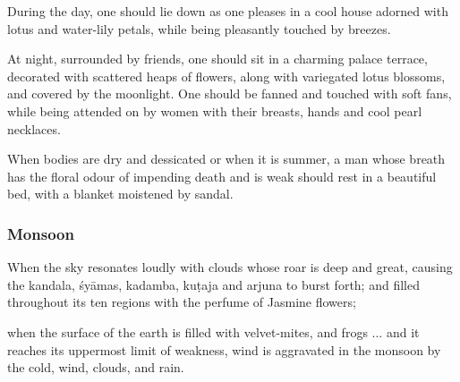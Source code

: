 \begin{translation}
\item[63]
During the day, one should lie down as one pleases %
in a cool house adorned with lotus and water-lily petals, %
while being pleasantly touched by breezes. %

\item[64--66ab]
At night, surrounded by friends, %
one should sit in a charming %
palace terrace, %
decorated with scattered heaps %
of flowers, along with variegated lotus blossoms, %
and covered by the moonlight.
One should be fanned and touched with soft fans, %
while being attended on by women %
with their breasts, hands and cool pearl necklaces.

\item[66cd-67ab] %
When bodies are dry and dessicated or when it is summer, %
a man whose breath has the floral odour of impending death  %
and is weak %
should rest in a beautiful bed, with a blanket moistened by sandal. %


\subsubsection{Monsoon}%

When the sky %
resonates loudly %
with clouds whose roar is deep and great,  %
%
causing the \gls{kandala}, %
\glspl{śyāma}, %
\gls{kadamba}, %
\gls{kuṭaja} %
and \gls{arjuna} to burst forth; %
%
and filled %
throughout its ten regions  %
with the perfume of Jasmine flowers;%

when the surface of the earth %
is filled %
with velvet-mites, %
and frogs %
...
and it reaches its uppermost limit of weakness, %
wind is aggravated in the monsoon by the cold, wind, clouds, and rain.
\end{translation}    
